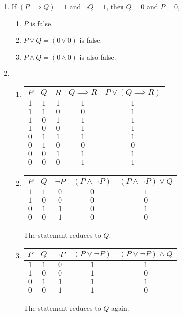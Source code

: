 \documentclass{homework}
\begin{document}
\begin{enumerate}
		\item If $(P \implies Q) = 1$ and $\neg Q = 1$, then $Q=0$ and $P=0$, \begin{enumerate}
			\item $P$ is false.
			\item $P \vee Q = \left(0 \vee 0\right)$ is false.
			\item $P \wedge Q = \left(0 \wedge 0\right)$ is also false.
		\end{enumerate}
	
		\item \begin{enumerate}
			\item \begin{tabular}[t]{ccc|c|c}
				$P$ & $Q$ & $R$ & $Q \implies R$ & $P \vee \left(Q \implies R\right)$ \\
				\midrule
				$1$ & $1$ & $1$ & $1$ & $1$ \\
				$1$ & $1$ & $0$ & $0$ & $1$\\
				$1$ & $0$ & $1$ & $1$ & $1$ \\
				$1$ & $0$ & $0$ & $1$ & $1$ \\
				$0$ & $1$ & $1$ & $1$ & $1$\\
				$0$ & $1$ & $0$ & $0$ & $0$\\
				$0$ & $0$ & $1$ & $1$ & $1$\\
				$0$ & $0$ & $0$ & $1$ & $1$\\
			\end{tabular}
		
			\item \begin{tabular}[t]{cc|cc|c}
				$P$ & $Q$ & $\neg P$ & $\left(P \wedge \neg P\right)$ & $\left(P \wedge \neg P\right) \vee Q$ \\
				\midrule
				$1$ & $1$ & $0$ & $0$ & $1$ \\
				$1$ & $0$ & $0$ & $0$ & $0$\\
				$0$ & $1$ & $1$ & $0$ & $1$\\
				$0$ & $0$ & $1$ & $0$ & $0$\\
			\end{tabular}
			
			The statement reduces to $Q$.
			
			\item \begin{tabular}[t]{cc|cc|c}
				$P$ & $Q$ & $\neg P$ & $\left(P \vee \neg P\right)$ & $\left(P \vee \neg P\right) \wedge Q$ \\
				\midrule
				$1$ & $1$ & $0$ & $1$ & $1$ \\
				$1$ & $0$ & $0$ & $1$ & $0$\\
				$0$ & $1$ & $1$ & $1$ & $1$\\
				$0$ & $0$ & $1$ & $1$ & $0$\\
			\end{tabular}
		
			The statement reduces to $Q$ again.
		\end{enumerate}
	\end{enumerate}
\end{document}
